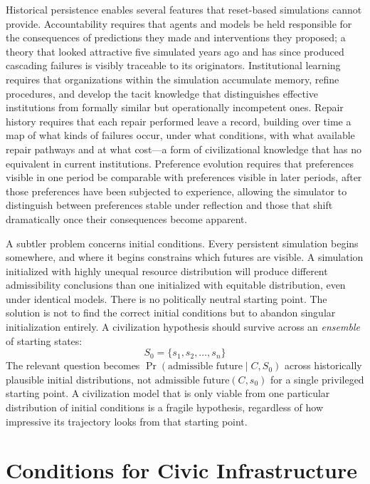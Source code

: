 \documentclass[12pt]{article}
\begin{document}
Historical persistence enables several features that reset-based simulations cannot provide. Accountability requires that agents and models be held responsible for the consequences of predictions they made and interventions they proposed; a theory that looked attractive five simulated years ago and has since produced cascading failures is visibly traceable to its originators. Institutional learning requires that organizations within the simulation accumulate memory, refine procedures, and develop the tacit knowledge that distinguishes effective institutions from formally similar but operationally incompetent ones. Repair history requires that each repair performed leave a record, building over time a map of what kinds of failures occur, under what conditions, with what available repair pathways and at what cost---a form of civilizational knowledge that has no equivalent in current institutions. Preference evolution requires that preferences visible in one period be comparable with preferences visible in later periods, after those preferences have been subjected to experience, allowing the simulator to distinguish between preferences stable under reflection and those that shift dramatically once their consequences become apparent.

A subtler problem concerns initial conditions. Every persistent simulation begins somewhere, and where it begins constrains which futures are visible. A simulation initialized with highly unequal resource distribution will produce different admissibility conclusions than one initialized with equitable distribution, even under identical models. There is no politically neutral starting point. The solution is not to find the correct initial conditions but to abandon singular initialization entirely. A civilization hypothesis should survive across an \emph{ensemble} of starting states:
\[
  S_0 = \{s_1, s_2, \ldots, s_n\}
\]
The relevant question becomes $\Pr(\text{admissible future} \mid C, S_0)$ across historically plausible initial distributions, not $\text{admissible future}(C, s_0)$ for a single privileged starting point. A civilization model that is only viable from one particular distribution of initial conditions is a fragile hypothesis, regardless of how impressive its trajectory looks from that starting point.

\section{Conditions for Civic Infrastructure}
\end{document}
